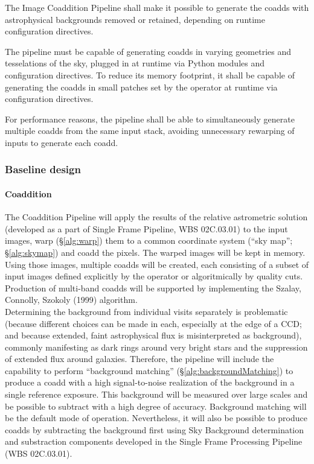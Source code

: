 \documentclass[12pt]{article}
\newcommand{\wbsSFM}{WBS 02C.03.01}
\begin{document}
The Image Coaddition Pipeline shall make it possible to generate the coadds with astrophysical backgrounds removed or retained, depending on runtime configuration directives.

The pipeline must be capable of generating coadds in varying geometries and tesselations of the sky, plugged in at runtime via Python modules and configuration directives. To reduce its memory footprint, it shall be capable of generating the coadds in small patches set by the operator at runtime via configuration directives.

For performance reasons, the pipeline shall be able to simultaneously generate multiple coadds from the same input stack, avoiding unnecessary rewarping of inputs to generate each coadd.

\subsubsection{Baseline design}

\paragraph{Coaddition} The Coaddition Pipeline will apply the results of the relative astrometric solution (developed as a part of Single Frame Pipeline, \wbsSFM) to the input images, warp (\S\ref{alg:warp}) them to a common coordinate system
(``sky map''; \S\ref{alg:skymap}) and coadd the pixels. The warped images will be kept in memory. Using those images, multiple coadds will be created, each consisting of a subset of input images defined explicitly by the operator or algoritmically by quality cuts.
\\

Production of multi-band coadds will be supported by implementing the Szalay, Connolly, Szokoly (1999) algorithm. %
\\

Determining the background from individual visits separately is problematic (because different choices can be made in each, especially at the edge of a CCD; and because extended, faint astrophysical flux is misinterpreted as background), commonly manifesting as dark rings around very bright stars and the suppression of extended flux around galaxies. Therefore, the pipeline will include the capability to perform ``background matching'' (\S\ref{alg:backgroundMatching}) to produce a coadd with a high signal-to-noise realization of the background in a single reference exposure.  This background will be measured over large scales and be possible to subtract with a high degree of accuracy. Background matching will be the default mode of operation. Nevertheless, it will also be possible to produce coadds by subtracting the background first using Sky Background determination and substraction components developed in the Single Frame Processing Pipeline (\wbsSFM).
\\
\end{document}
